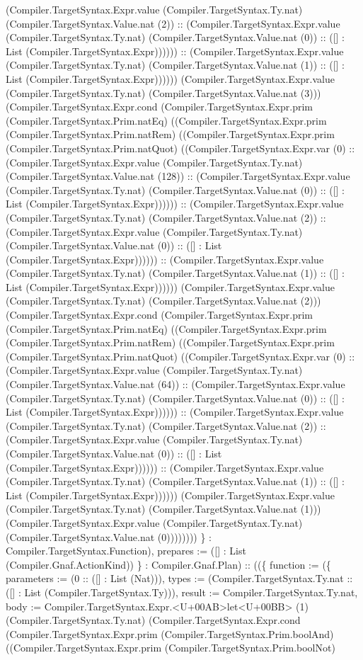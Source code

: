 \documentclass[11pt]{article}
\begin{document}
(Compiler.TargetSyntax.Expr.value (Compiler.TargetSyntax.Ty.nat) (Compiler.TargetSyntax.Value.nat (2)) :: (Compiler.TargetSyntax.Expr.value (Compiler.TargetSyntax.Ty.nat) (Compiler.TargetSyntax.Value.nat (0)) :: ([] : List (Compiler.TargetSyntax.Expr)))))) :: (Compiler.TargetSyntax.Expr.value (Compiler.TargetSyntax.Ty.nat) (Compiler.TargetSyntax.Value.nat (1)) :: ([] : List (Compiler.TargetSyntax.Expr)))))) (Compiler.TargetSyntax.Expr.value (Compiler.TargetSyntax.Ty.nat) (Compiler.TargetSyntax.Value.nat (3))) (Compiler.TargetSyntax.Expr.cond (Compiler.TargetSyntax.Expr.prim (Compiler.TargetSyntax.Prim.natEq) ((Compiler.TargetSyntax.Expr.prim (Compiler.TargetSyntax.Prim.natRem) ((Compiler.TargetSyntax.Expr.prim (Compiler.TargetSyntax.Prim.natQuot) ((Compiler.TargetSyntax.Expr.var (0) :: (Compiler.TargetSyntax.Expr.value (Compiler.TargetSyntax.Ty.nat) (Compiler.TargetSyntax.Value.nat (128)) :: (Compiler.TargetSyntax.Expr.value (Compiler.TargetSyntax.Ty.nat) (Compiler.TargetSyntax.Value.nat (0)) :: ([] : List (Compiler.TargetSyntax.Expr)))))) :: (Compiler.TargetSyntax.Expr.value (Compiler.TargetSyntax.Ty.nat) (Compiler.TargetSyntax.Value.nat (2)) :: (Compiler.TargetSyntax.Expr.value (Compiler.TargetSyntax.Ty.nat) (Compiler.TargetSyntax.Value.nat (0)) :: ([] : List (Compiler.TargetSyntax.Expr)))))) :: (Compiler.TargetSyntax.Expr.value (Compiler.TargetSyntax.Ty.nat) (Compiler.TargetSyntax.Value.nat (1)) :: ([] : List (Compiler.TargetSyntax.Expr)))))) (Compiler.TargetSyntax.Expr.value (Compiler.TargetSyntax.Ty.nat) (Compiler.TargetSyntax.Value.nat (2))) (Compiler.TargetSyntax.Expr.cond (Compiler.TargetSyntax.Expr.prim (Compiler.TargetSyntax.Prim.natEq) ((Compiler.TargetSyntax.Expr.prim (Compiler.TargetSyntax.Prim.natRem) ((Compiler.TargetSyntax.Expr.prim (Compiler.TargetSyntax.Prim.natQuot) ((Compiler.TargetSyntax.Expr.var (0) :: (Compiler.TargetSyntax.Expr.value (Compiler.TargetSyntax.Ty.nat) (Compiler.TargetSyntax.Value.nat (64)) :: (Compiler.TargetSyntax.Expr.value (Compiler.TargetSyntax.Ty.nat) (Compiler.TargetSyntax.Value.nat (0)) :: ([] : List (Compiler.TargetSyntax.Expr)))))) :: (Compiler.TargetSyntax.Expr.value (Compiler.TargetSyntax.Ty.nat) (Compiler.TargetSyntax.Value.nat (2)) :: (Compiler.TargetSyntax.Expr.value (Compiler.TargetSyntax.Ty.nat) (Compiler.TargetSyntax.Value.nat (0)) :: ([] : List (Compiler.TargetSyntax.Expr)))))) :: (Compiler.TargetSyntax.Expr.value (Compiler.TargetSyntax.Ty.nat) (Compiler.TargetSyntax.Value.nat (1)) :: ([] : List (Compiler.TargetSyntax.Expr)))))) (Compiler.TargetSyntax.Expr.value (Compiler.TargetSyntax.Ty.nat) (Compiler.TargetSyntax.Value.nat (1))) (Compiler.TargetSyntax.Expr.value (Compiler.TargetSyntax.Ty.nat) (Compiler.TargetSyntax.Value.nat (0)))))))) \} : Compiler.TargetSyntax.Function), prepares := ([] : List (Compiler.Gnaf.ActionKind)) \} : Compiler.Gnaf.Plan) :: ((\{ function := (\{ parameters := (0 :: ([] : List (Nat))), types := (Compiler.TargetSyntax.Ty.nat :: ([] : List (Compiler.TargetSyntax.Ty))), result := Compiler.TargetSyntax.Ty.nat, body := Compiler.TargetSyntax.Expr.<U+00AB>let<U+00BB> (1) (Compiler.TargetSyntax.Ty.nat) (Compiler.TargetSyntax.Expr.cond (Compiler.TargetSyntax.Expr.prim (Compiler.TargetSyntax.Prim.boolAnd) ((Compiler.TargetSyntax.Expr.prim (Compiler.TargetSyntax.Prim.boolNot) 
\end{document}
